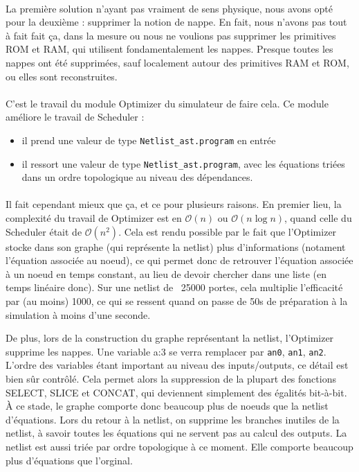 \documentclass{article}
\begin{document}
\paragraph{}La première solution n'ayant pas vraiment de sens physique, nous avons opté pour la deuxième : supprimer la notion de nappe.
En  fait, nous n'avons pas tout à fait fait ça, dans la mesure ou nous ne  voulions pas supprimer les primitives ROM et RAM, qui utilisent  fondamentalement les nappes.
Presque toutes les nappes ont été supprimées, sauf localement autour des primitives RAM et ROM, ou elles sont reconstruites.

\paragraph{}C'est le travail du module Optimizer du simulateur de faire cela. Ce module améliore le travail de Scheduler :
\begin{itemize}
	\item il prend une valeur de type \texttt{Netlist\_ast.program} en entrée
	\item il ressort une valeur de type \texttt{Netlist\_ast.program}, avec les équations  triées dans un ordre topologique au niveau des dépendances.
\end{itemize}

\paragraph{}Il fait cependant mieux que ça, et ce pour plusieurs raisons.
En premier lieu, la complexité du travail de Optimizer est  en $\mathcal O(n)$ ou $\mathcal O(n\log n)$, quand celle du Scheduler était de $\mathcal O(n^2)$. Cela  est rendu possible par le fait que l'Optimizer stocke dans son graphe  (qui représente la netlist) plus d'informations (notament l'équation  associée au noeud), ce qui permet donc de retrouver l'équation associée à  un noeud en temps constant, au lieu de devoir chercher dans une liste  (en temps linéaire donc). Sur une netlist de ~25000 portes, cela  multiplie l'efficacité par (au moins) 1000, ce qui se ressent quand on  passe de 50s de préparation à la simulation à moins d'une seconde.

De plus, lors de la construction du graphe représentant la netlist,  l'Optimizer supprime les nappes. Une variable a:3 se verra remplacer par \texttt{a\-n0}, \texttt{a\-n1}, \texttt{a\-n2}. L'ordre  des variables étant important au niveau des inputs/outputs, ce détail  est bien sûr  contrôlé. Cela permet alors la suppression de la plupart des fonctions  SELECT, SLICE et CONCAT, qui deviennent simplement des égalités  bit-à-bit. À ce stade, le graphe comporte donc beaucoup plus de noeuds  que la netlist d'équations.
Lors  du retour à la netlist, on supprime les branches inutiles de la  netlist, à savoir toutes les équations qui ne servent pas au calcul des  outputs. La netlist est aussi triée par ordre topologique à ce moment.  Elle comporte beaucoup plus d'équations que l'orginal.
\end{document}

